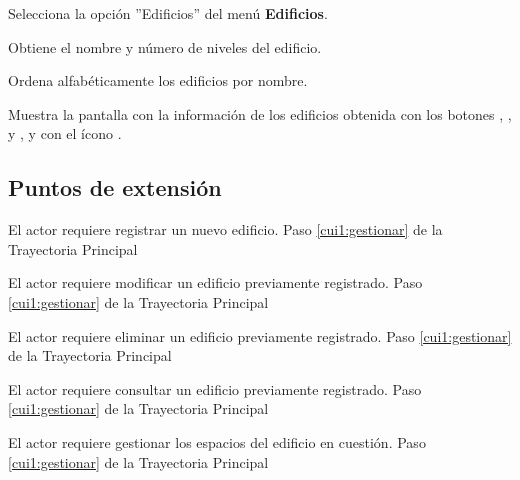 \begin{UCtrayectoria}
	
	\UCpaso [\UCactor] Selecciona la opción ''Edificios'' del menú \textbf{Edificios}.
	
	\UCpaso [\UCsist] Obtiene el nombre y número de niveles del edificio.
	
	\UCpaso [\UCsist] Ordena alfabéticamente los edificios por nombre.
	
	\UCpaso[\UCsist] Muestra la pantalla  con la información de los edificios obtenida con los botones , ,  y , y con el ícono \btnRegistrar. 
	\label{cui1:gestionar}
\end{UCtrayectoria}

\subsection{Puntos de extensión}

\UCExtensionPoint 
{El actor requiere registrar un nuevo edificio.}
{Paso \ref{cui1:gestionar} de la Trayectoria Principal}
{}

\UCExtensionPoint 
{El actor requiere modificar un edificio previamente registrado.}
{Paso \ref{cui1:gestionar} de la Trayectoria Principal}
{}

\UCExtensionPoint 
{El actor requiere eliminar un edificio previamente registrado.}
{Paso \ref{cui1:gestionar} de la Trayectoria Principal}
{}

\UCExtensionPoint 
{El actor requiere consultar un edificio previamente registrado.}
{Paso \ref{cui1:gestionar} de la Trayectoria Principal}
{}

\UCExtensionPoint 
{El actor requiere gestionar los espacios del edificio en cuestión.}
{Paso \ref{cui1:gestionar} de la Trayectoria Principal}
{}